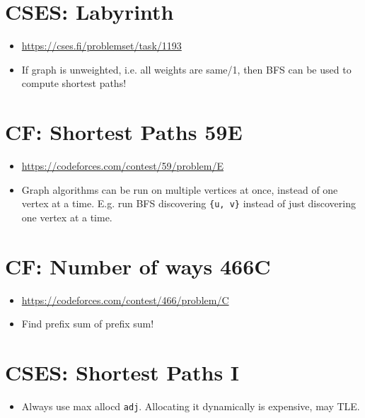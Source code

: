 \documentclass[titlepage, 12pt]{book}
\begin{document}
\section{CSES: Labyrinth}
\begin{itemize}
  \item\url{https://cses.fi/problemset/task/1193}
  \item If graph is unweighted, i.e. all weights are same/1, then BFS can be
    used to compute shortest paths!
\end{itemize}

\section{CF: Shortest Paths 59E}
\begin{itemize}
  \item \url{https://codeforces.com/contest/59/problem/E}
  \item Graph algorithms can be run on multiple vertices at once, instead of
    one vertex at a time. E.g. run BFS discovering \verb|{u, v}| instead of just
    discovering one vertex at a time.
\end{itemize}

\section{CF: Number of ways 466C}
\begin{itemize}
  \item \url{https://codeforces.com/contest/466/problem/C}
  \item Find prefix sum of prefix sum!
\end{itemize}

\section{CSES: Shortest Paths I}
\begin{itemize}
  \item Always use max allocd \verb|adj|. Allocating it dynamically is
    expensive, may TLE.
\end{itemize}
\end{document}
